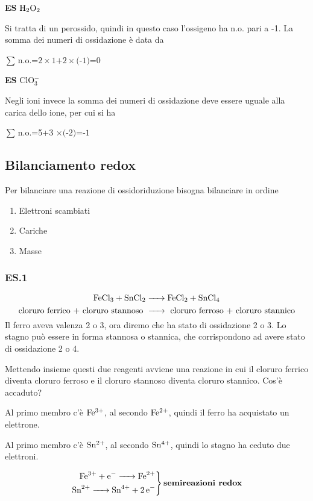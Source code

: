 \begin{itemize}
  \textbf{ES} $\rm H_2O_2$

  Si tratta di un perossido, quindi in questo caso l'ossigeno ha n.o. pari a -1. La somma dei numeri di ossidazione è data da
  \begin{center}
    $\sum\,$n.o.=$2 \times \text{1+2} \times \text{(-1)=0}$
  \end{center}

  \textbf{ES} ClO$_3^-$

  Negli ioni invece la somma dei numeri di ossidazione deve essere uguale alla carica dello ione, per cui si ha
  \begin{center}
  $\sum\,$n.o.=5+3 $\times \text{(-2)=-1}$
  \end{center}

\end{itemize}

\newpage
\subsection{Bilanciamento redox}
Per bilanciare una reazione di ossidoriduzione bisogna bilanciare in ordine
\begin{enumerate}
    \item Elettroni scambiati
    \item Cariche
    \item Masse
  \end{enumerate}
\subsubsection{\textbf{ES.1}}
$$\ce{FeCl_3 + SnCl_2 -> FeCl_2 + SnCl_4}$$
$$\text{cloruro ferrico + cloruro stannoso \ce{->} cloruro ferroso + cloruro stannico}$$
Il ferro aveva valenza 2 o 3, ora diremo che ha stato di ossidazione 2 o 3. Lo stagno può essere in forma stannosa o stannica, che corrispondono ad avere stato di ossidazione 2 o 4.

Mettendo insieme questi due reagenti avviene una reazione in cui il cloruro ferrico diventa cloruro ferroso e il cloruro stannoso diventa cloruro stannico. Cos'è accaduto?

Al primo membro c'è $\rm Fe^{3+}$, al secondo $\rm Fe^{2+}$, quindi il ferro ha acquistato un elettrone.

Al primo membro c'è $\rm Sn^{2+}$, al secondo $\rm Sn^{4+}$, quindi lo stagno ha ceduto due elettroni.

\begin{equation*}
  \left.\begin{aligned}
  \ce{Fe^{3+} + e^- -> Fe^{2+}}\\
  \ce{Sn^{2+} -> Sn^{4+} + 2 e^-}
\end{aligned}\right\} \textbf{semireazioni redox}
\end{equation*}

